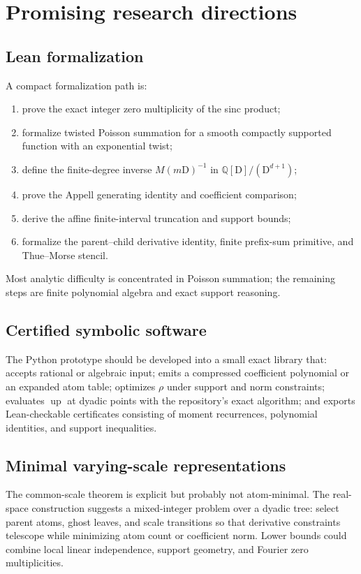 \documentclass[11pt,oneside]{article}
\theoremstyle{definition}
\theoremstyle{remark}
\newcommand{\Q}{\mathbb Q}
\newcommand{\Up}{\operatorname{up}}
\newcommand{\D}{\mathrm D}
\begin{document}
\section{Promising research directions}
\label{sec:future}

\subsection{Lean formalization}

A compact formalization path is:
\begin{enumerate}
  \item prove the exact integer zero multiplicity of the sinc product;
  \item formalize twisted Poisson summation for a smooth compactly supported
        function with an exponential twist;
  \item define the finite-degree inverse \(M(m\D)^{-1}\) in
        \(\Q[\D]/(\D^{d+1})\);
  \item prove the Appell generating identity and coefficient comparison;
  \item derive the affine finite-interval truncation and support bounds;
  \item formalize the parent--child derivative identity, finite prefix-sum
        primitive, and Thue--Morse stencil.
\end{enumerate}
Most analytic difficulty is concentrated in Poisson summation; the remaining
steps are finite polynomial algebra and exact support reasoning.

\subsection{Certified symbolic software}

The Python prototype should be developed into a small exact library that:
accepts rational or algebraic input; emits a compressed coefficient polynomial
or an expanded atom table; optimizes \(\rho\) under support and norm
constraints; evaluates \(\Up\) at dyadic points with the repository's exact
algorithm; and exports Lean-checkable certificates consisting of moment
recurrences, polynomial identities, and support inequalities.

\subsection{Minimal varying-scale representations}

The common-scale theorem is explicit but probably not atom-minimal.  The
real-space construction suggests a mixed-integer problem over a dyadic tree:
select parent atoms, ghost leaves, and scale transitions so that derivative
constraints telescope while minimizing atom count or coefficient norm.
Lower bounds could combine local linear independence, support geometry, and
Fourier zero multiplicities.
\end{document}
